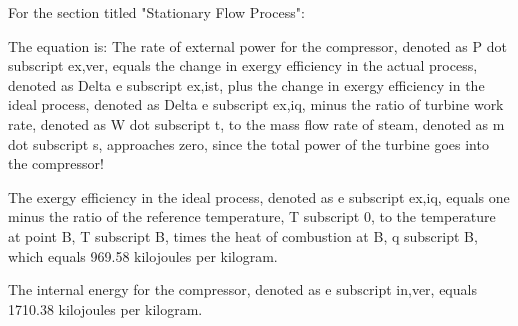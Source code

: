 For the section titled "Stationary Flow Process":

The equation is:
The rate of external power for the compressor, denoted as P dot subscript ex,ver, equals the change in exergy efficiency in the actual process, denoted as Delta e subscript ex,ist, plus the change in exergy efficiency in the ideal process, denoted as Delta e subscript ex,iq, minus the ratio of turbine work rate, denoted as W dot subscript t, to the mass flow rate of steam, denoted as m dot subscript s, approaches zero, since the total power of the turbine goes into the compressor!

The exergy efficiency in the ideal process, denoted as e subscript ex,iq, equals one minus the ratio of the reference temperature, T subscript 0, to the temperature at point B, T subscript B, times the heat of combustion at B, q subscript B, which equals 969.58 kilojoules per kilogram.

The internal energy for the compressor, denoted as e subscript in,ver, equals 1710.38 kilojoules per kilogram.